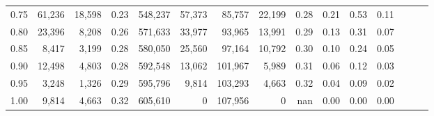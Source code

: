 \begin{tabular}{rrrrrrrrrrrrrrr}
0.75 &  61,236 &  18,598 &  0.23 &  548,237 &   57,373 &   85,757 &   22,199 &  0.28 &  0.21 &  0.53 &      0.11 \\
0.80 &  23,396 &   8,208 &  0.26 &  571,633 &   33,977 &   93,965 &   13,991 &  0.29 &  0.13 &  0.31 &      0.07 \\
0.85 &   8,417 &   3,199 &  0.28 &  580,050 &   25,560 &   97,164 &   10,792 &  0.30 &  0.10 &  0.24 &      0.05 \\
0.90 &  12,498 &   4,803 &  0.28 &  592,548 &   13,062 &  101,967 &    5,989 &  0.31 &  0.06 &  0.12 &      0.03 \\
0.95 &   3,248 &   1,326 &  0.29 &  595,796 &    9,814 &  103,293 &    4,663 &  0.32 &  0.04 &  0.09 &      0.02 \\
1.00 &   9,814 &   4,663 &  0.32 &  605,610 &        0 &  107,956 &        0 &   nan &  0.00 &  0.00 &      0.00 \\
\bottomrule
\end{tabular}
